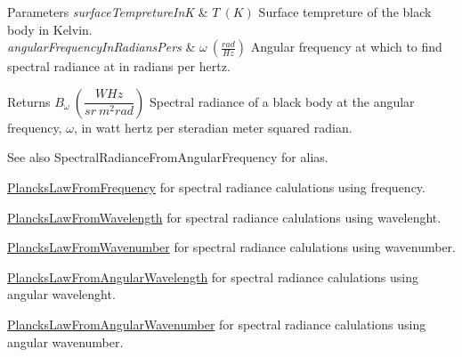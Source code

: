 \begin{DoxyParams}{Parameters}
{\em surface\+Tempreture\+InK} & $T\ (K)$ Surface tempreture of the black body in Kelvin. \\
\hline
{\em angular\+Frequency\+In\+Radians\+Pers} & $\omega\ (\frac{rad}{Hz})$ Angular frequency at which to find spectral radiance at in radians per hertz. \\
\hline
\end{DoxyParams}
\begin{DoxyReturn}{Returns}
$B_{\omega}\ ( \dfrac{W Hz}{sr\ m^2 rad})$ Spectral radiance of a black body at the angular frequency, $\omega$, in watt hertz per steradian meter squared radian. 
\end{DoxyReturn}
\begin{DoxySeeAlso}{See also}
Spectral\+Radiance\+From\+Angular\+Frequency for alias. 

\mbox{\hyperlink{group___e_g_x_phys-_electrodynamics-_black_body-_plancks_law_ga68aae82f8a086831358c4a61c8c80ba4}{Plancks\+Law\+From\+Frequency}} for spectral radiance calulations using frequency. 

\mbox{\hyperlink{group___e_g_x_phys-_electrodynamics-_black_body-_plancks_law_ga54639bc031ded51ef78aa82b0457a4dd}{Plancks\+Law\+From\+Wavelength}} for spectral radiance calulations using wavelenght. 

\mbox{\hyperlink{group___e_g_x_phys-_electrodynamics-_black_body-_plancks_law_ga6648ae2a0fbff6735c1e1a04c7cac746}{Plancks\+Law\+From\+Wavenumber}} for spectral radiance calulations using wavenumber. 

\mbox{\hyperlink{group___e_g_x_phys-_electrodynamics-_black_body-_plancks_law_ga7322124727f968d28807e918c5eeb23f}{Plancks\+Law\+From\+Angular\+Wavelength}} for spectral radiance calulations using angular wavelenght. 

\mbox{\hyperlink{group___e_g_x_phys-_electrodynamics-_black_body-_plancks_law_gaa3d3e0fdb77d25bdd40523f9975de902}{Plancks\+Law\+From\+Angular\+Wavenumber}} for spectral radiance calulations using angular wavenumber. 
\end{DoxySeeAlso}
\mbox{\label{group___e_g_x_phys-_electrodynamics-_black_body-_plancks_law_ga7322124727f968d28807e918c5eeb23f}} 

